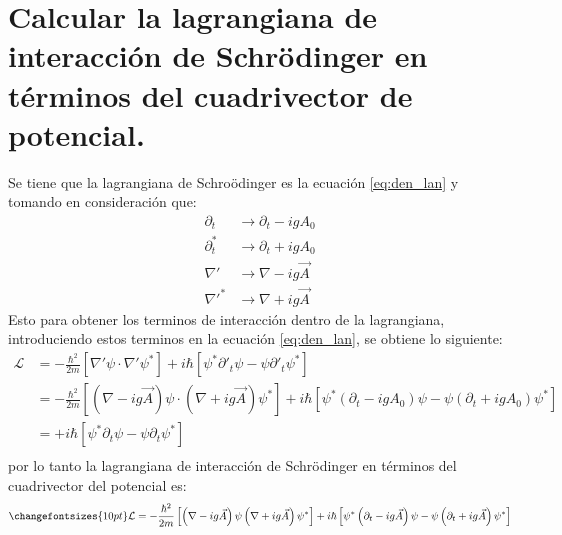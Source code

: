 \section{Calcular la lagrangiana de interacción de Schr\"odinger en términos del cuadrivector de potencial.}
Se tiene que la lagrangiana de Schro\"odinger es la ecuación \ref{eq:den_lan} y tomando en consideración que:
\begin{align*}
    \partial_t &\rightarrow\partial_t -igA_0\\
    \partial_t^* &\rightarrow\partial_t +igA_0\\
    {\nabla}' & \rightarrow \nabla - ig\vec{A}\\
    {\nabla}'^* & \rightarrow \nabla + ig\vec{A}
\end{align*}
Esto para obtener los terminos de interacción dentro de la lagrangiana, introduciendo estos terminos en la ecuación \ref{eq:den_lan}, se obtiene lo siguiente:
\begin{align*}
    \mathcal{L} &= -\frac{\hbar^2}{2m}\left[ {\nabla}'\psi \cdot {\nabla}' \psi^*\right] + i\hbar \left[\psi^* {\partial}'_t \psi - \psi {\partial}'_t \psi^*\right]\\
    &= -\frac{\hbar^2}{2m}\left[ \left(\nabla - ig\vec{A}\right)\psi \cdot \left( \nabla + ig\vec{A}\right) \psi^*\right] + i\hbar \left[\psi^* \left(\partial_t -igA_0\right) \psi - \psi \left(\partial_t +igA_0\right) \psi^*\right]\\
    &= + i\hbar \left[\psi^*\partial_t \psi - \psi \partial_t \psi^*\right]\\
\end{align*}
por lo tanto la lagrangiana de interacción de Schr\"odinger en términos del cuadrivector del potencial es:
\begin{equation}
    \changefontsizes{10pt}
    \mathcal{L}= -\frac{\hbar^2}{2m}\left[ \left(\nabla - ig\vec{A}\right)\psi \left( \nabla + ig\vec{A}\right) \psi^*\right] + i\hbar \left[\psi^* \left(\partial_t -ig\vec{A}\right) \psi - \psi \left(\partial_t +ig\vec{A}\right) \psi^*\right]
    \label{eq:den_lag_a}
\end{equation}